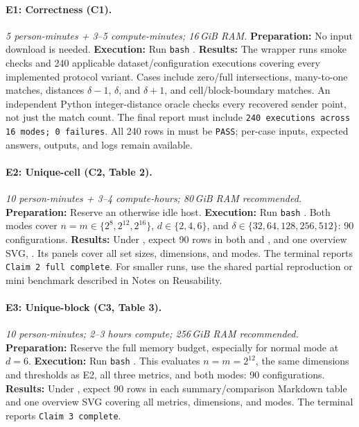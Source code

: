 \paragraph{E1: Correctness (C1).}
\emph{5 person-minutes + 3--5 compute-minutes; 16\,GiB RAM.}
\textbf{Preparation:} No input download is needed.
\textbf{Execution:} Run \texttt{bash} .
\textbf{Results:} The wrapper runs smoke checks and 240 applicable
dataset/configuration executions covering every implemented protocol variant.
Cases include zero/full
intersections, many-to-one matches, distances $\delta-1$, $\delta$, and
$\delta+1$, and cell/block-boundary matches. An independent Python
integer-distance oracle checks every recovered sender point, not just the
match count. The final report must include
\texttt{240 executions across 16 modes; 0 failures}.
All 240 rows in \allowbreak
{} must be \texttt{PASS}; per-case inputs,
expected answers, outputs, and logs remain available.

\paragraph{E2: Unique-cell (C2, Table 2).}
\emph{10 person-minutes + 3--4 compute-hours; 80\,GiB RAM recommended.}
\textbf{Preparation:} Reserve an otherwise idle host.
\textbf{Execution:} Run \texttt{bash} .
Both modes cover
$n=m\in\{2^8,2^{12},2^{16}\}$, $d\in\{2,4,6\}$, and
$\delta\in\{32,64,128,256,512\}$: 90 configurations.
\textbf{Results:} Under , expect 90 rows
in both  and , and one
overview SVG, . Its panels cover all set sizes, dimensions,
and modes. The terminal reports
\texttt{Claim 2 full complete}. For smaller runs, use the shared partial
reproduction or mini benchmark described in Notes on Reusability.

\paragraph{E3: Unique-block (C3, Table 3).}
\emph{10 person-minutes; 2--3 hours compute; 256\,GiB RAM recommended.}
\textbf{Preparation:} Reserve the full memory budget, especially for normal
mode at $d=6$.
\textbf{Execution:} Run \texttt{bash} .
This evaluates $n=m=2^{12}$, the same dimensions and thresholds as E2,
all three metrics, and both modes: 90 configurations.
\textbf{Results:} Under , expect 90 rows
in each summary/comparison Markdown table and one overview SVG covering all metrics,
dimensions, and modes.
The terminal reports \texttt{Claim 3 complete}.

